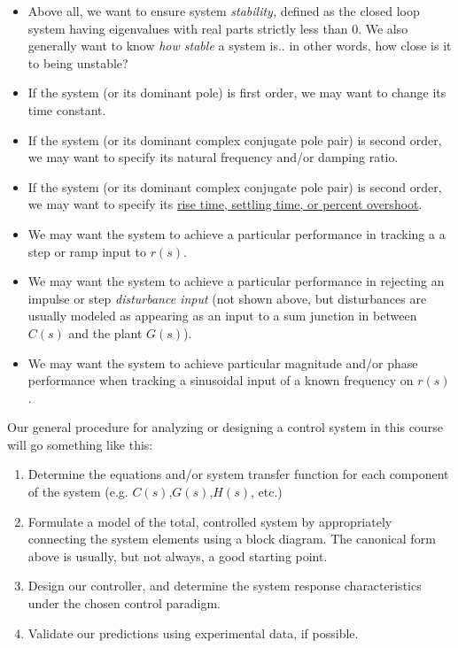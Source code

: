 \documentclass[11pt]{article}
\providecommand{\tightlist}{%
      \setlength{\itemsep}{0pt}\setlength{\parskip}{0pt}}
\begin{document}
\begin{itemize}
\tightlist
\item
  Above all, we want to ensure system \emph{stability,} defined as the
  closed loop system having eigenvalues with real parts strictly less
  than 0. We also generally want to know \emph{how stable} a system is..
  in other words, how close is it to being unstable?
\item
  If the system (or its dominant pole) is first order, we may want to
  change its time constant.
\item
  If the system (or its dominant complex conjugate pole pair) is second
  order, we may want to specify its natural frequency and/or damping
  ratio.
\item
  If the system (or its dominant complex conjugate pole pair) is second
  order, we may want to specify its
  \href{http://faculty.mercer.edu/jenkins_he/documents/2ndorderresponseMSD.pdf}{rise
  time, settling time, or percent overshoot}.
\item
  We may want the system to achieve a particular performance in tracking
  a a step or ramp input to \(r(s)\).
\item
  We may want the system to achieve a particular performance in
  rejecting an impulse or step \emph{disturbance input} (not shown
  above, but disturbances are usually modeled as appearing as an input
  to a sum junction in between \(C(s)\) and the plant \(G(s)\)).
\item
  We may want the system to achieve particular magnitude and/or phase
  performance when tracking a sinusoidal input of a known frequency on
  \(r(s)\).
\end{itemize}

Our general procedure for analyzing or designing a control system in
this course will go something like this:

\begin{enumerate}
\def\labelenumi{\arabic{enumi}.}
\tightlist
\item
  Determine the equations and/or system transfer function for each
  component of the system (e.g. \(C(s)\),\(G(s)\),\(H(s)\), etc.)
\item
  Formulate a model of the total, controlled system by appropriately
  connecting the system elements using a block diagram. The canonical
  form above is usually, but not always, a good starting point.
\item
  Design our controller, and determine the system response
  characteristics under the chosen control paradigm.
\item
  Validate our predictions using experimental data, if possible.
\end{enumerate}
\end{document}
